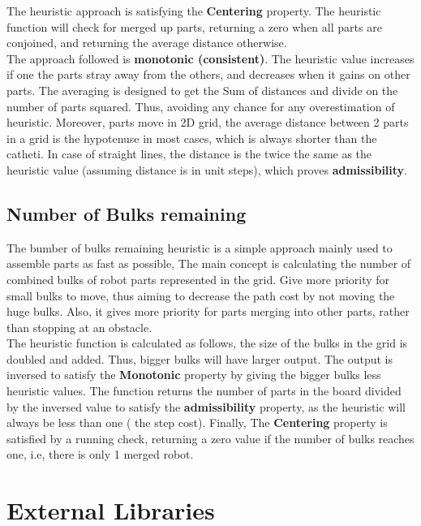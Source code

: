 The heuristic approach is satisfying the \textbf{Centering} property. The heuristic function will check for merged up parts, returning a zero when all parts are conjoined, and returning the average distance otherwise. \\

The approach followed is \textbf{monotonic (consistent)}. The heuristic value increases if one the parts stray away from the others, and decreases when it gains on other parts. The averaging is designed to get the Sum of distances and divide on the number of parts squared. Thus, avoiding any chance for any overestimation of heuristic. Moreover, parts move in 2D grid, the average distance between 2 parts in a grid is the hypotenuse in most cases, which is always shorter than the catheti. In case of straight lines, the distance is the twice the same as the heuristic value (assuming distance is in unit steps), which proves \textbf{admissibility}.	


\section{Number of Bulks remaining}

The bumber of bulks remaining heuristic is a simple approach mainly used to assemble parts as fast as possible, The main concept is calculating the number of combined bulks of robot parts represented in the grid. Give more priority for small bulks to move, thus aiming to decrease the path cost by not moving the huge bulks. Also, it gives more priority for parts merging into other parts, rather than stopping at an obstacle.  \\

The heuristic function is calculated as follows, the size of the bulks in the grid is doubled and added. Thus, bigger bulks will have larger output. The output is inversed to satisfy the \textbf{Monotonic} property by giving the bigger bulks less heuristic values. The function returns the number of parts in the board divided by the inversed value to satisfy the \textbf{admissibility} property, as the heuristic will always be less than one ( the step cost). Finally, The \textbf{Centering} property is satisfied by a running check, returning a zero value if the number of bulks reaches one, i.e, there is only 1 merged robot.


\chapter{External Libraries}


